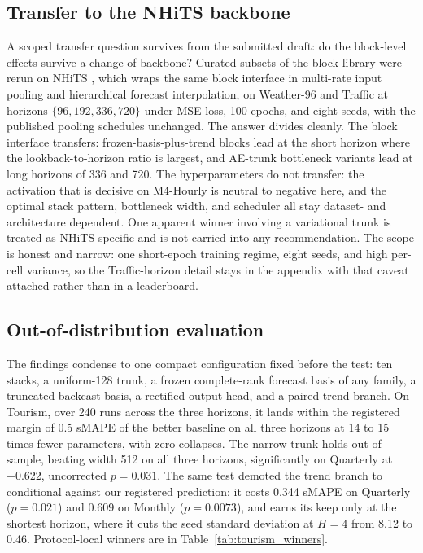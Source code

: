 \subsection{Transfer to the NHiTS backbone}
\label{sec:results:nhits}

A scoped transfer question survives from the submitted draft: do the
block-level effects survive a change of backbone? Curated subsets of the
block library were rerun on NHiTS \citep{challu2023nhits}, which wraps
the same block interface in multi-rate input pooling and hierarchical
forecast interpolation, on Weather-96 and Traffic at horizons
$\{96, 192, 336, 720\}$ under MSE loss, 100 epochs, and eight seeds, with
the published pooling schedules unchanged. The answer divides cleanly.
The block interface transfers: frozen-basis-plus-trend blocks lead at
the short horizon where the lookback-to-horizon ratio is largest, and
AE-trunk bottleneck variants lead at long horizons of 336 and 720. The
hyperparameters do not transfer: the activation that is decisive on
M4-Hourly is neutral to negative here, and the optimal stack pattern,
bottleneck width, and scheduler all stay dataset- and architecture
dependent. One apparent winner involving a variational trunk is treated
as NHiTS-specific and is not carried into any recommendation. The scope
is honest and narrow: one short-epoch training regime, eight seeds, and
high per-cell variance, so the Traffic-horizon detail stays in the
appendix with that caveat attached rather than in a leaderboard.

\subsection{Out-of-distribution evaluation}
\label{sec:results:ood}

The findings condense to one compact configuration fixed before the
test: ten stacks, a uniform-128 trunk, a frozen complete-rank forecast
basis of any family, a truncated backcast basis, a rectified output
head, and a paired trend branch. On Tourism, over 240 runs across the
three horizons, it lands within the registered margin of 0.5 sMAPE of
the better baseline on all three horizons at 14 to 15 times fewer
parameters, with zero collapses. The narrow trunk holds out of sample,
beating width 512 on all three horizons, significantly on Quarterly at
$-0.622$, uncorrected $p = 0.031$. The same test demoted the trend branch
to conditional against our registered prediction: it costs 0.344 sMAPE
on Quarterly ($p = 0.021$) and 0.609 on Monthly ($p = 0.0073$), and
earns its keep only at the shortest horizon, where it cuts the seed
standard deviation at $H = 4$ from 8.12 to 0.46. Protocol-local winners
are in Table~\ref{tab:tourism_winners}.

